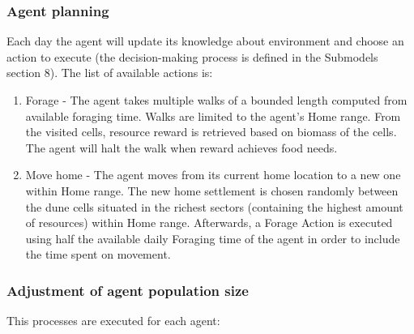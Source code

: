 \documentclass[11pt,oneside,a4paper,openright]{report}
\begin{document}
\subsubsection{Agent planning}
Each day the agent will update its knowledge about environment and choose an action to execute (the
decision-making process is defined in the Submodels section 8). The list of available actions is:
\begin{enumerate}
\item Forage - The agent takes multiple walks of a bounded length computed from available
foraging time. Walks are limited to the agent’s Home range. From the visited cells, resource
reward is retrieved based on biomass of the cells. The agent will halt the walk when reward
achieves food needs.
\item Move home - The agent moves from its current home location to a new one within Home
range. The new home settlement is chosen randomly between the dune cells situated in the
richest sectors (containing the highest amount of resources) within Home range. Afterwards, a
Forage Action is executed using half the available daily Foraging time of the agent in order to
include the time spent on movement.
\end{enumerate}


\subsubsection{Adjustment of agent population size}
This processes are executed for each agent:
\end{document}
